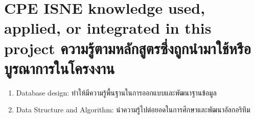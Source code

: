 






\section{\ifenglish%
\ifcpe CPE \else ISNE \fi knowledge used, applied, or integrated in this project
\else%
ความรู้ตามหลักสูตรซึ่งถูกนำมาใช้หรือบูรณาการในโครงงาน
\fi
}
\begin{enumerate}
  \item Database design: ทำให้มีความรู้พื้นฐานในการออกแบบและพัฒนาฐานข้อมูล
  \item Data Structure and Algorithm: นำความรู้ไปต่อยอดในการศึกษาและพัฒนาอัลกอริทึม
\end{enumerate}



